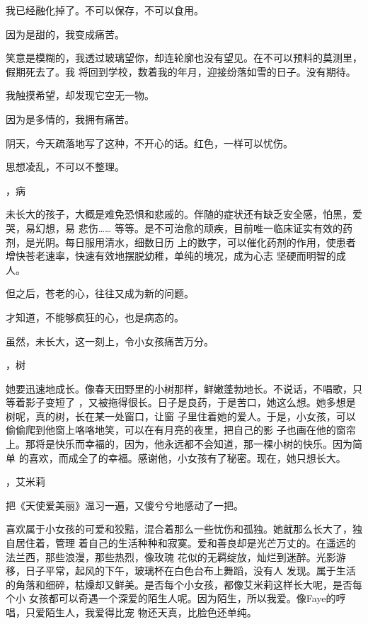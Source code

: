 \documentclass[12pt,a4paper]{article}
\newcommand{\subpart}[1]{
	\begingroup \par
	\vspace{1ex} \centering #1
	\par \endgroup \nopagebreak[4]
}
\begin{document}
		我已经融化掉了。不可以保存，不可以食用。

		因为是甜的，我变成痛苦。

		笑意是模糊的，我透过玻璃望你，却连轮廓也没有望见。在不可以预料的莫测里，假期死去了。我
	将回到学校，数着我的年月，迎接纷落如雪的日子。没有期待。

		我触摸希望，却发现它空无一物。

		因为是多情的，我拥有痛苦。

		阴天，今天疏落地写了这种，不开心的话。红色，一样可以忧伤。

	\endwriting



		思想凌乱，不可以不整理。

		\subpart{1，病}

		未长大的孩子，大概是难免恐惧和悲戚的。伴随的症状还有缺乏安全感，怕黑，爱哭，易幻想，易
	悲伤…… 等等。是不可治愈的顽疾，目前唯一临床证实有效的药剂，是光阴。每日服用清水，细数日历
	上的数字，可以催化药剂的作用，使患者增快苍老速率，快速有效地摆脱幼稚，单纯的境况，成为心志
	坚硬而明智的成人。

		但之后，苍老的心，往往又成为新的问题。

		才知道，不能够疯狂的心，也是病态的。

		虽然，未长大，这一刻上，令小女孩痛苦万分。


		\subpart{2，树}

		她要迅速地成长。像春天田野里的小树那样，鲜嫩蓬勃地长。不说话，不唱歌，只等着影子变短了
	，又被拖得很长。日子是良药，于是苦口，她这么想。她多想是树呢，真的树，长在某一处窗口，让窗
	子里住着她的爱人。于是，小女孩，可以偷偷爬到他窗上咯咯地笑，可以在有月亮的夜里，把自己的影
	子也画在他的窗帘上。那将是快乐而幸福的，因为，他永远都不会知道，那一棵小树的快乐。因为简单
	的喜欢，而成全了的幸福。感谢他，小女孩有了秘密。现在，她只想长大。


		\subpart{3，艾米莉}

		把《天使爱美丽》温习一遍，又傻兮兮地感动了一把。

		喜欢属于小女孩的可爱和狡黠，混合着那么一些忧伤和孤独。她就那么长大了，独自居住着，管理
	着自己的生活种种和寂寞。爱和善良却是光芒万丈的。在遥远的法兰西，那些浪漫，那些热烈，像玫瑰
	花似的无羁绽放，灿烂到迷醉。光影游移，日子平常，起风的下午，玻璃杯在白色台布上舞蹈，没有人
	发现。属于生活的角落和细碎，枯燥却又鲜美。是否每个小女孩，都像艾米莉这样长大呢，是否每个小
	女孩都可以奇遇一个深爱的陌生人呢。因为陌生，所以我爱。像Faye的哼唱，只爱陌生人，我爱得比宠
	物还天真，比脸色还单纯。
\end{document}
